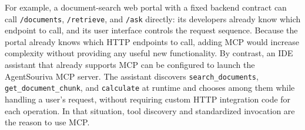 
For example, a document-search web portal with a fixed backend contract can call \texttt{/documents}, \texttt{/retrieve}, and \texttt{/ask} directly: its developers already know which endpoint to call, and its user interface controls the request sequence. Because the portal already knows which HTTP endpoints to call, adding MCP would increase complexity without providing any useful new functionality. By contrast, an IDE assistant that already supports MCP can be configured to launch the AgentSouriva MCP server. The assistant discovers \texttt{search\_documents}, \texttt{get\_document\_chunk}, and \texttt{calculate} at runtime and chooses among them while handling a user's request, without requiring custom HTTP integration code for each operation. In that situation, tool discovery and standardized invocation are the reason to use MCP.

